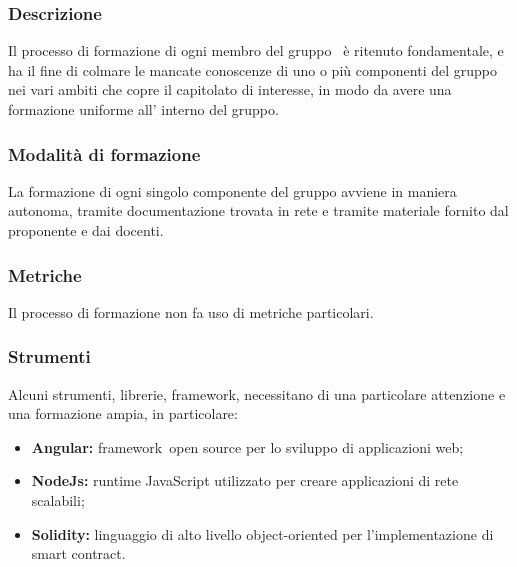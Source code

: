         \subsubsection {Descrizione}
        Il processo di formazione di ogni membro del gruppo \groupName\ è ritenuto fondamentale, e ha il fine di colmare le mancate conoscenze di uno o più componenti del gruppo nei vari ambiti che copre il capitolato di interesse, in modo da avere una formazione uniforme all' interno del gruppo.
        \subsubsection {Modalità di formazione}
        La formazione di ogni singolo componente del gruppo avviene in maniera autonoma, tramite documentazione trovata in rete e tramite materiale fornito dal proponente e dai docenti.
        \subsubsection {Metriche}
        Il processo di formazione non fa uso di metriche particolari.
        \subsubsection {Strumenti}
        Alcuni strumenti, librerie, framework\glo, necessitano di una particolare attenzione e una formazione ampia, in particolare:
        \begin {itemize}
          \item \textbf{Angular:} framework\glo\ open source per lo sviluppo di applicazioni web;
          \item \textbf{NodeJs: } runtime JavaScript utilizzato per creare applicazioni di rete scalabili;
          \item \textbf{Solidity: } linguaggio di alto livello object-oriented per l'implementazione di smart contract\glo.
        \end {itemize}